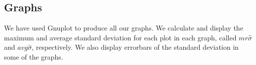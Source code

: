 \subsection{Graphs}
We have used Gnuplot to produce all our graphs.
We calculate and display the maximum and average standard deviation for each plot in each graph, called $mr\hat{\sigma}$ and $avg\hat{\sigma}$, respectively.
We also display errorbars of the standard deviation in some of the graphs.
